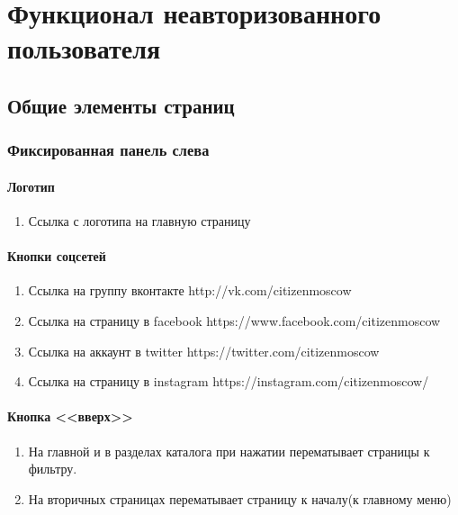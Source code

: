 \chapter{Функционал неавторизованного пользователя}
    \section{Общие элементы страниц}
        \subsection{Фиксированная панель слева}
            \label{sec:baseitems_fixleft_panel}
            \subsubsection{Логотип}
                \begin{enumerate}
                    \item Ссылка с логотипа на главную страницу
                \end{enumerate}
            \subsubsection{Кнопки соцсетей}
                \begin{enumerate}
                    \item Ссылка на группу вконтакте http://vk.com/citizenmoscow
                    \item Ссылка на страницу в facebook https://www.facebook.com/citizenmoscow
                    \item Ссылка на аккаунт в twitter https://twitter.com/citizenmoscow
                    \item Ссылка на страницу в instagram https://instagram.com/citizenmoscow/
                \end{enumerate}
            \subsubsection{Кнопка <<вверх>>}
                \begin{enumerate}
                    \item На главной и в разделах каталога при нажатии перематывает страницы к фильтру. 
                    \item На вторичных страницах перематывает страницу к началу(к главному меню)
                \end{enumerate}
